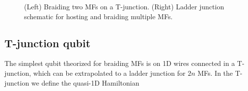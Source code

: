 \begin{figure}[t]
  \caption{(Left) Braiding two MFs on a T-junction. (Right) Ladder junction schematic for hosting and braiding multiple MFs.}
  \label{fig:t-junction-braid}
\end{figure}

\subsection{T-junction qubit}
The simplest qubit theorized for braiding MFs is on 1D wires connected in a T-junction, which can be extrapolated to a ladder junction for $2n$ MFs.
In the T-junction we define the quasi-1D Hamiltonian

